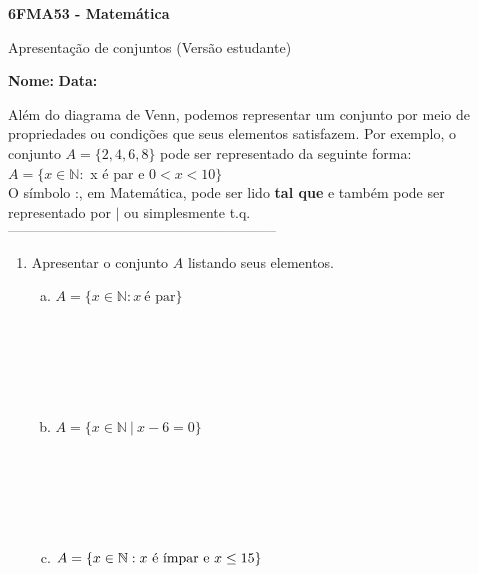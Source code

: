 \documentclass[a4paper,14pt]{article}
\begin{document}
	
	\noindent\textbf{6FMA53 - Matemática} 
	
	\begin{center}Apresentação de conjuntos (Versão estudante)
	\end{center}
	
	\noindent\textbf{Nome:} \underline{\hspace{10cm}}
	\noindent\textbf{Data:} \underline{\hspace{4cm}}
	
	\begin{multicols}{2}
    		\noindent Além do diagrama de Venn, podemos representar um conjunto por meio de propriedades ou condições que seus elementos satisfazem. Por exemplo, o conjunto $A = \{2, 4, 6, 8\}$ pode ser representado da seguinte forma: \\
    		$A = \{x \in \mathbb{N} :$ x é par e $0 < x < 10\}$ \\
    		O símbolo :, em Matemática, pode ser lido \textbf{tal que} e também pode ser representado por $|$ ou simplesmente t.q.\\
    		\textsubscript{---------------------------------------------------------------------}
    		\begin{enumerate}
    			\item Apresentar o conjunto $A$ listando seus elementos.
    			\begin{enumerate}[a)]
    				\item $A = \{x \in \mathbb{N} : x~\text{é par}\}$ \\\\\\\\\\\\
    				\item $A = \{x \in \mathbb{N}~|~ x - 6 = 0\}$ \\\\\\\\\\\\
    				\item $A = \\ \{x \in \mathbb{N} : x \text{~é ímpar e~} x \leq 15\}$ \\\\\\\\

\end{enumerate}
\end{enumerate}
\end{multicols}
\end{document}
